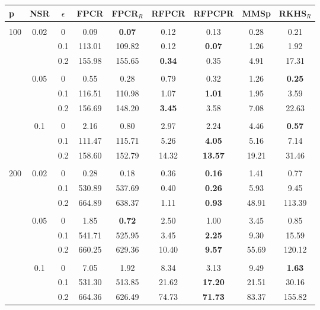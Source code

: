 \documentclass[11pt]{article}
\begin{document}
\begin{table}[ht!]


\centering
{\small
\vspace{0.5cm} 
\begin{tabular}{l| c| c | c c c c c c }
p & NSR & $\epsilon$ & FPCR & FPCR$_R$ & RFPCR & RFPCPR & MMSp & RKHS$_R$   \\ \hline\hline  \\[-0.3cm]
\multirow{9}{*}{100} & \multirow{3}{*}{0.02} & 0 & 0.09 & \textbf{0.07} &   0.12 & 0.13 & 0.28 & 0.21 \\ 
& & 0.1 & 113.01 &  109.82 & 0.12 & \textbf{0.07} & 1.26  & 1.92 \\
& & 0.2 & 155.98 & 155.65 & \textbf{0.34} & 0.35 & 4.91 & 17.31 \\\cline{2-9} \\[-0.3cm]
& \multirow{3}{*}{0.05} & 0 &  0.55 &  0.28 & 0.79  & 0.32 & 1.26  & \textbf{0.25} \\
& & 0.1 & 116.51  & 110.98	  & 1.07 & \textbf{1.01} & 1.95 & 3.59  \\ 
& & 0.2 & 156.69  &  148.20 &  \textbf{3.45} & 3.58 & 7.08 & 22.63 \\\cline{2-9} \\[-0.3cm]
& \multirow{3}{*}{0.1} & 0 &  2.16 & 0.80 & 2.97 & 2.24
 & 4.46  & \textbf{0.57} \\  
& & 0.1 & 111.47 &  115.71 & 5.26 & \textbf{4.05} & 5.16 & 7.14 \\ 
& & 0.2 & 158.60  &  152.79 &  14.32 & \textbf{13.57} & 19.21 &  31.46 \\\cline{1-9} \\[-0.3cm]
\multirow{9}{*}{200} & \multirow{3}{*}{0.02} & 0 & 0.28	 & 0.18 & 0.36 & \textbf{0.16} & 1.41 & 0.77  \\ 
& & 0.1 & 530.89 & 537.69 & 0.40 & \textbf{0.26}  & 5.93 & 9.45 \\
& & 0.2 & 664.89 & 638.37 & 1.11 & \textbf{0.93}  & 48.91 & 113.39 \\\cline{2-9} \\[-0.3cm]
& \multirow{3}{*}{0.05} & 0 &  1.85 &  \textbf{0.72} & 2.50 & 1.00 & 3.45 & 0.85 \\
& & 0.1 & 541.71 & 525.95 &  3.45 & \textbf{2.25} & 9.30 & 15.59\\ 
& & 0.2 &  660.25 & 629.36 & 10.40 & \textbf{9.57} & 55.69 & 120.12 \\\cline{2-9} \\[-0.3cm]
& \multirow{3}{*}{0.1} & 0 &  7.05 & 1.92 & 8.34  & 3.13 & 9.49 & \textbf{1.63} \\  
& & 0.1 & 531.30 & 513.85 & 21.62 & \textbf{17.20} & 21.51	 & 30.16 \\ 
& & 0.2 &  664.36 &   626.49 &  74.73 & \textbf{71.73} & 83.37 & 155.82  \\\cline{1-9}
\end{tabular}}
\vspace{0.5cm} 


\end{table}
\end{document}

